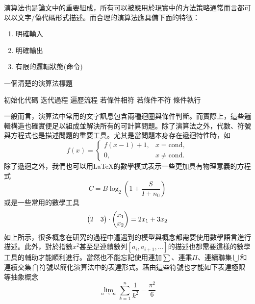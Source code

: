 \documentclass[12pt]{report}
\theoremstyle{plain}
\begin{document}
演算法也是論文中的重要組成，所有可以被應用於現實中的方法策略通常而言都可以以文字/偽代碼形式描述。而合理的演算法應具備下面的特徵：
\begin{enumerate}
    \item 明確輸入
    \item 明確輸出
    \item 有限的邏輯狀態(命令)
\end{enumerate}
\begin{algorithm}
\caption{一個清楚的演算法標題}
\label{alg:alg}
初始化代碼\;
{
    迭代過程\;
    {
        遍歷流程\;
        {
            若條件相符\;
        }
        {
            若條件不符\;
            {
                條件執行\;
            }
        }
    }
}
\end{algorithm}
一般而言，演算法中常用的文字訊息包含兩種迴圈與條件判斷。而實際上，這些邏輯構造也確實便足以組成並解決所有的可計算問題。除了演算法之外，代數、符號與方程式也是描述問題的重要工具。尤其是當問題本身存在遞迴特性時，如
\[
f(x) = 
\begin{cases}
    f(x-1)+1, &x=\mathrm{cond},\\
    0, &x\neq \mathrm{cond}.
\end{cases}
\]
除了遞迴之外，我們也可以用\LaTeX 的數學模式表示一些更加具有物理意義的方程式
\begin{equation}
\label{eq:eq}
    C=B\log_2\left(1+\frac{S}{I+n_0}\right)
\end{equation}
或是一些常用的數學工具
\begin{equation}
\begin{pmatrix} 
2 & 3 
\end{pmatrix} \cdot 
\begin{pmatrix} 
x_1 \\ 
x_2 
\end{pmatrix} 
= 2x_1 + 3x_2 \\
\end{equation}
如上所示，很多概念在研究的過程中遭遇到的模型與概念都需要使用數學語言進行描述。此外，對於指數$x^2$甚至是連續數列$[a_i,a_{i+1},\dots]$的描述也都需要這樣的數學工具的輔助才能順利進行。當然也不能忘記使用連加$\sum$、連乘$\Pi$、連續聯集$\bigcup$和連續交集$\bigcap$符號以簡化演算法中的表達形式。藉由這些符號也才能如下表達極限等抽象概念
\[
\lim_{n \to \infty} \sum_{k=1}^{n} \frac{1}{k^2} = \frac{\pi^2}{6}
\]
\end{document}
